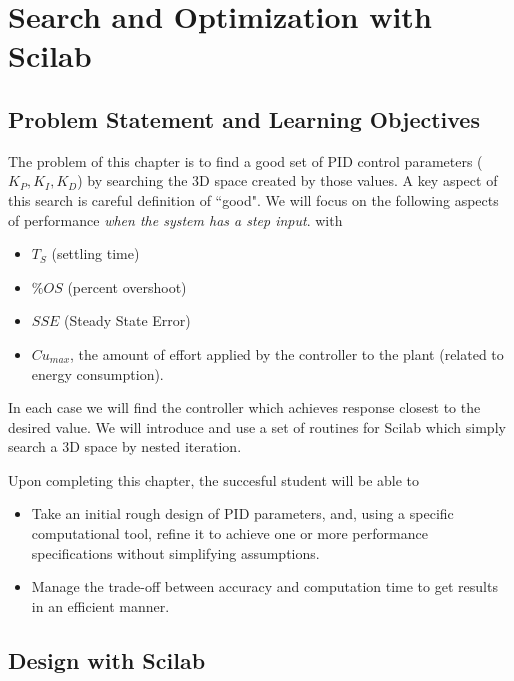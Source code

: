 %
%
%

\chapter{Search and Optimization with Scilab}

\section{Problem Statement and Learning Objectives}

The problem of this chapter is to find a good set of PID control parameters ($K_P,K_I,K_D$) by searching the 3D space created by those values.
A key aspect of this search is careful definition of ``good".  We will focus on  the following aspects of performance
{\it when the system has a step input}.
with 
\begin{itemize}
\item  $T_S$ (settling time)
\item $\%OS$ (percent overshoot)
\item $SSE$ (Steady State Error)
\item $Cu_{max}$, the amount of effort applied by the controller to the plant (related to energy consumption).
\end{itemize}

In each case we will find the controller which achieves response closest to the desired value.  We will introduce and use a set of routines for Scilab which simply search a 3D space by nested iteration.

Upon completing this chapter, the succesful student will be able to

\begin{itemize}
  \item Take an initial rough design of PID parameters, and, using a specific computational tool, refine it to achieve one or more performance specifications without simplifying assumptions.
  \item Manage the trade-off between accuracy and computation time to get results in an efficient manner.
\end{itemize}




\section{Design with Scilab}

